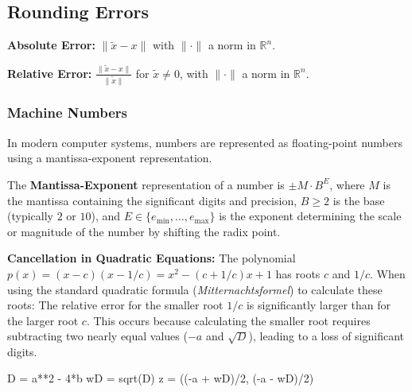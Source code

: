 \subsection{Rounding Errors}  

\begin{definition} 
    \textbf{Absolute Error:} $\|\tilde{x} - x\|$ with $\|\cdot\|$ a norm in $\mathbb{R}^n$.
\end{definition}  

\begin{definition} 
    \textbf{Relative Error:} $\frac{\|\tilde{x} - x\|}{\|\tilde{x}\|}$ for $\tilde{x} \neq 0$, with $\|\cdot\|$ a norm in $\mathbb{R}^n$.
\end{definition}  

\subsubsection{Machine Numbers}  

\begin{remark} 
    In modern computer systems, numbers are represented as floating-point numbers using a mantissa-exponent representation.
\end{remark}  

\begin{definition} 
    The \textbf{Mantissa-Exponent} representation of a number is $\pm M \cdot B^E$, where $M$ is the mantissa containing the significant digits and precision, $B \ge 2$ is the base (typically $2$ or $10$), and $E \in \{e_{\min}, \dots, e_{\max}\}$ is the exponent determining the scale or magnitude of the number by shifting the radix point.
\end{definition}  

\begin{example} 
    \textbf{Cancellation in Quadratic Equations:} The polynomial $p(x) = (x-c)(x-1/c) = x^2 - (c + 1/c)x + 1$ has roots $c$ and $1/c$. When using the standard quadratic formula (\textit{Mitternachtsformel}) to calculate these roots:
    The relative error for the smaller root $1/c$ is significantly larger than for the larger root $c$. This occurs because calculating the smaller root requires subtracting two nearly equal values ($-a$ and $\sqrt{D}$), leading to a loss of significant digits.
\end{example}  

\begin{codeexample}
D = a**2 - 4*b
wD = sqrt(D)
z = ((-a + wD)/2, (-a - wD)/2)
\end{codeexample}

